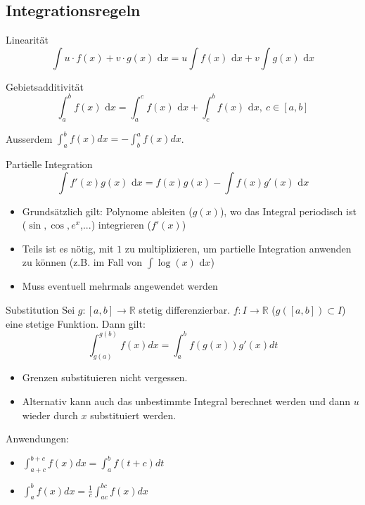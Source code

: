 \documentclass[a4paper,10pt]{article}
\def\dx{\text{ d}x}
\begin{document}
\subsection{Integrationsregeln}
\begin{subbox}{Linearität}
 \vspace{-12pt}
 $$\int u\cdot f(x) + v \cdot g(x) \dx = u \int f(x) \dx + v \int g(x) \dx$$
\end{subbox}
\begin{subbox}{Gebietsadditivität}
 \vspace{-12pt}
 $$\int_a^b f(x) \dx = \int_a^c f(x) \dx + \int_c^b f(x) \dx, \ c \in [a,b]$$
\end{subbox}

Ausserdem $\int_{a}^{b} f(x) dx = -\int_{b}^{a} f(x) dx$.
\begin{mainbox}{Partielle Integration}
 \vspace{-12pt}
 $$\int f'(x) g(x) \dx = f(x)g(x) - \int f(x) g'(x) \dx$$
\end{mainbox}
\begin{itemize}
 \item Grundsätzlich gilt: Polynome ableiten ($g(x)$), wo das Integral periodisch ist ($\sin, \cos, e^x$,...) integrieren ($f'(x)$)
 \item Teils ist es nötig, mit $1$ zu multiplizieren, um partielle Integration anwenden zu können (z.B. im Fall von $\int \log(x) \dx$)
 \item Muss eventuell mehrmals angewendet werden
\end{itemize}
\begin{mainbox}{Substitution}
  Sei $g: [a, b] \to \mathbb{R}$ stetig differenzierbar. $f: I \to \mathbb{R}$ ($g([a, b]) \subset I$) eine stetige Funktion. Dann gilt:
  $$\int_{g(a)}^{g(b)} f(x)dx = \int_{a}^{b} f(g(x))g'(x)dt$$
\end{mainbox}
\begin{itemize}
 \item Grenzen substituieren nicht vergessen.
 \item Alternativ kann auch das unbestimmte Integral berechnet werden und dann $u$ wieder durch $x$ substituiert werden.
\end{itemize}

Anwendungen:
\begin{itemize}
  \item $\int_{a+c}^{b+c} f(x)dx = \int_a^b f(t+c)dt$
  \item $\int_a^b f(x)dx = \frac{1}{c} \int_{ac}^{bc} f(x)dx$
\end{itemize}
\end{document}
